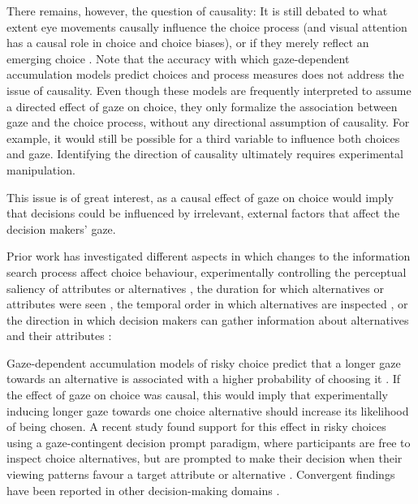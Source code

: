 \documentclass[11pt, a4paper, twocolumn, abstract]{scrartcl}
\begin{document}
There remains, however, the question of causality: It is still debated to what extent eye movements causally influence the choice process (and visual attention has a causal role in choice and choice biases), or if they merely reflect an emerging choice \parencite{mormann2021DoesAttentionIncrease,westbrook2020DopaminePromotesCognitive}. Note that the accuracy with which gaze-dependent accumulation models predict choices and process measures does not address the issue of causality. Even though these models are frequently interpreted to assume a directed effect of gaze on choice, they only formalize the association between gaze and the choice process, without any directional assumption of causality. For example, it would still be possible for a third variable to influence both choices and gaze. Identifying the direction of causality ultimately requires experimental manipulation.

This issue is of great interest, as a causal effect of gaze on choice would imply that decisions could be influenced by irrelevant, external factors that affect the decision makers' gaze.

Prior work has investigated different aspects in which changes to the information search process affect choice behaviour, experimentally controlling the perceptual saliency of attributes or alternatives \parencite{weber1997ReasonsRankDependentUtility,milosavljevic2012RelativeVisualSaliency}, the duration for which alternatives or attributes were seen \parencite{armel2008BiasingSimpleChoices,shimojo2003GazeBiasBoth,tavares2017AttentionalDriftDiffusion,parnamets2015BiasingMoralDecisions,liu2020ExploitingDynamicsEye,sui2020TimingGazecontingentDecision,lim2011DecisionValueComputations}, the temporal order in which alternatives are inspected \parencite{liu2020PowerLastFixation}, or the direction in which decision makers can gather information about alternatives and their attributes \parencite{reeck2017SearchPredictsChanges, mittone2020InducingAlternativebasedCharacteristicbased}:

Gaze-dependent accumulation models of risky choice predict that a longer gaze towards an alternative is associated with a higher probability of choosing it \parencite[unless its value is aversive; see][]{smith2019GazeAmplifiesValue}. If the effect of gaze on choice was causal, this would imply that experimentally inducing longer gaze towards one choice alternative should increase its likelihood of being chosen.
A recent study found support for this effect in risky choices using a gaze-contingent decision prompt paradigm, where participants are free to inspect choice alternatives, but are prompted to make their decision when their viewing patterns favour a target attribute or alternative \parencite{sui2020TimingGazecontingentDecision}. Convergent findings have been reported in other decision-making domains \parencite{parnamets2015BiasingMoralDecisions,tavares2017AttentionalDriftDiffusion,liu2020ExploitingDynamicsEye,armel2008BiasingSimpleChoices,shimojo2003GazeBiasBoth}.
\end{document}
